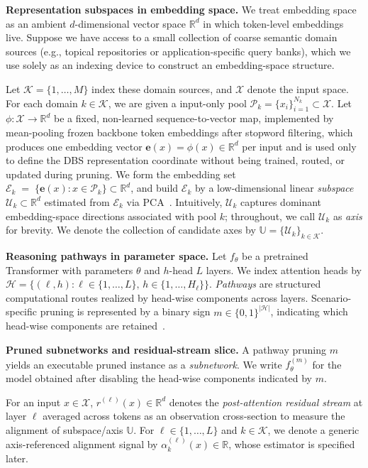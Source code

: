 \textbf{Representation subspaces in embedding space.}
We treat embedding space as an ambient $d$-dimensional vector space $\mathbb{R}^d$ in which token-level embeddings live.
Suppose we have access to a small collection of coarse semantic domain sources (e.g., topical repositories or application-specific query banks), which we use solely as an indexing device to construct an embedding-space structure.

Let $\mathcal{K}=\{1,\dots,M\}$ index these domain sources, and $\mathcal{X}$ denote the input space. For each domain $k\in\mathcal{K}$, we are given a input-only pool $\mathcal{P}_k=\{x_i\}_{i=1}^{N_k}\subset\mathcal{X}$. 
Let $\phi:\mathcal{X}\rightarrow\mathbb{R}^d$ be a fixed, non-learned sequence-to-vector map, implemented by mean-pooling frozen backbone token embeddings after stopword filtering, which produces one embedding vector $\mathbf{e}(x)=\phi(x)\in\mathbb{R}^d$ per input and is used only to define the DBS representation coordinate without being trained, routed, or updated during pruning.
We form the embedding set $\mathcal{E}_k \;=\;\{\mathbf{e}(x): x\in \mathcal{P}_k\}\subset\mathbb{R}^d$, 
and build $\mathcal{E}_k$ by a low-dimensional linear \emph{subspace} $\mathcal{U}_k \subset \mathbb{R}^d$ estimated from $\mathcal{E}_k$ via PCA~\cite{abdi2010pca,fernando2013unsupervised,gong2012geodesic,vidal2011subspace}.
Intuitively, $\mathcal{U}_k$ captures dominant embedding-space directions associated with pool $k$; throughout, we call $\mathcal{U}_k$ as \emph{axis} for brevity.
We denote the collection of candidate axes by $\mathbb{U}=\{\mathcal{U}_k\}_{k\in\mathcal{K}}$.

\textbf{Reasoning pathways in parameter space.}
Let $f_\theta$ be a pretrained Transformer with parameters $\theta$ and $h$-head $L$ layers. We index attention heads by $\mathcal{H}=\{(\ell,h): \ell\in\{1,\dots,L\},\, h\in\{1,\dots,H_\ell\}\}$.
\emph{Pathways} are structured computational routes realized by head-wise components across layers. Scenario-specific pruning is represented by a binary sign $m \in \{0,1\}^{|\mathcal{H}|}$, 
indicating which head-wise components are retained~\cite{voita2019heads}.

\textbf{Pruned subnetworks and residual-stream slice.}
A pathway pruning $m$ yields an executable pruned instance as a \emph{subnetwork}. We write $f_{\theta}^{(m)}$ for the model obtained after disabling the head-wise components indicated by $m$.

For an input $x\in\mathcal{X}$, $r^{(\ell)}(x)\in\mathbb{R}^d$ denotes the \emph{post-attention residual stream} at layer $\ell$ averaged across tokens\cite{elhage2021framework} as an observation cross-section to measure the alignment of subspace/axis $\mathbb{U}$.
For $\ell\in\{1,\dots,L\}$ and $k\in\mathcal{K}$, we denote a generic axis-referenced alignment signal by $\alpha^{(\ell)}_k(x)\in\mathbb{R}$, 
whose estimator is specified later.

